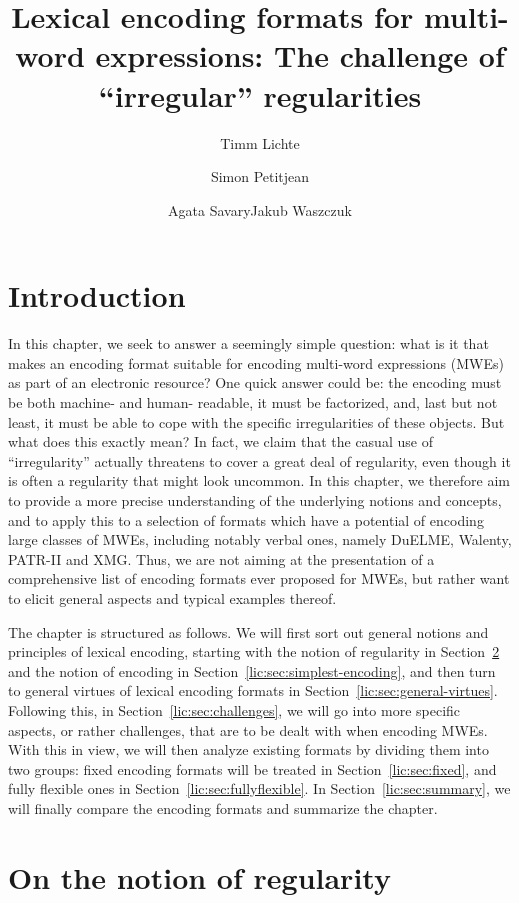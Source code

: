 \documentclass[output=paper]{langsci/langscibook}
\author{Timm Lichte\affiliation{University of Düsseldorf}\and Simon Petitjean\affiliation{University of Düsseldorf}\and Agata Savary\affiliation{University of Tours}\lastand Jakub Waszczuk\affiliation{Université of Tours\\University of Orléans}}
\title{Lexical encoding formats for multi-word expressions: The challenge of ``irregular'' regularities}
\begin{document}
\maketitle


%
\section{Introduction}

In this chapter, we seek to answer a seemingly simple question: what is it that makes an encoding format suitable for encoding multi-word expressions (MWEs) as part of an electronic resource? One quick answer could be: the encoding must be both machine- and human- readable, it must be factorized, and, last but not least, it must be able to cope with the specific irregularities of these objects. But what does this exactly mean? In fact, we claim that the casual use of ``irregularity'' actually threatens to cover a great deal of regularity, even though it is often a regularity that might look uncommon. In this chapter, we therefore aim to provide a more precise understanding of the underlying notions and concepts, and to apply this to a selection of formats which have a potential of encoding large classes of MWEs, including notably verbal ones, namely DuELME, Walenty, PATR-II and XMG. Thus, we are not aiming at the presentation of a comprehensive list of encoding formats ever proposed for MWEs, but rather want to elicit general aspects and typical examples thereof. 

The chapter is structured as follows. We will first sort out general notions and principles of lexical encoding, starting with the notion of regularity in Section~\ref{lic:sec:notion-regularity} and the notion of encoding in Section~\ref{lic:sec:simplest-encoding}, and then turn to general virtues of lexical encoding formats in Section~\ref{lic:sec:general-virtues}. Following this, in Section~\ref{lic:sec:challenges}, we will go into more specific aspects, or rather challenges, that are to be dealt with when encoding MWEs. With this in view, we will then analyze existing formats by dividing them into two groups: fixed encoding formats will be treated in Section~\ref{lic:sec:fixed}, and fully flexible ones in Section~\ref{lic:sec:fullyflexible}. In Section~\ref{lic:sec:summary}, we will finally compare the encoding formats and summarize the chapter.

\section{ On the notion of regularity}
\label{lic:sec:notion-regularity}
\end{document}

